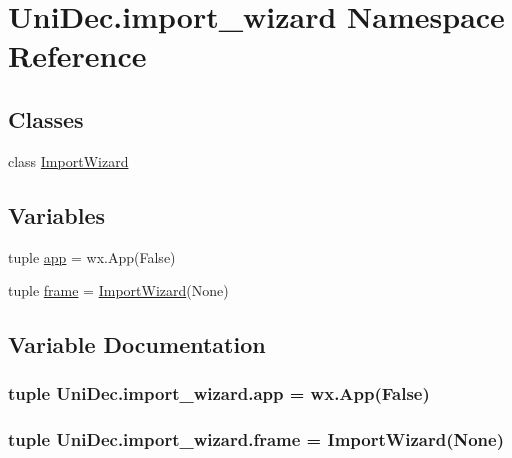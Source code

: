 \hypertarget{namespace_uni_dec_1_1import__wizard}{}\section{Uni\+Dec.\+import\+\_\+wizard Namespace Reference}
\label{namespace_uni_dec_1_1import__wizard}
\subsection*{Classes}
\begin{DoxyCompactItemize}
\item 
class \hyperlink{class_uni_dec_1_1import__wizard_1_1_import_wizard}{Import\+Wizard}
\end{DoxyCompactItemize}
\subsection*{Variables}
\begin{DoxyCompactItemize}
\item 
tuple \hyperlink{namespace_uni_dec_1_1import__wizard_a236d29cef61c88f4f138a387dd1d19da}{app} = wx.\+App(False)
\item 
tuple \hyperlink{namespace_uni_dec_1_1import__wizard_a9c50984141f7ae8a13a3cd219a0874ec}{frame} = \hyperlink{class_uni_dec_1_1import__wizard_1_1_import_wizard}{Import\+Wizard}(None)
\end{DoxyCompactItemize}


\subsection{Variable Documentation}
\hypertarget{namespace_uni_dec_1_1import__wizard_a236d29cef61c88f4f138a387dd1d19da}{}
\subsubsection[{app}]{\setlength{\rightskip}{0pt plus 5cm}tuple Uni\+Dec.\+import\+\_\+wizard.\+app = wx.\+App(False)}\label{namespace_uni_dec_1_1import__wizard_a236d29cef61c88f4f138a387dd1d19da}
\hypertarget{namespace_uni_dec_1_1import__wizard_a9c50984141f7ae8a13a3cd219a0874ec}{}
\subsubsection[{frame}]{\setlength{\rightskip}{0pt plus 5cm}tuple Uni\+Dec.\+import\+\_\+wizard.\+frame = {\bf Import\+Wizard}(None)}\label{namespace_uni_dec_1_1import__wizard_a9c50984141f7ae8a13a3cd219a0874ec}
